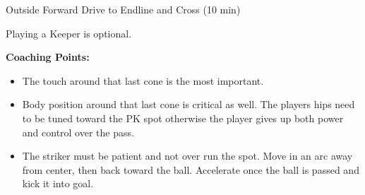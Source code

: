 \begin{evenBlock}{Outside Forward Drive to Endline and Cross (10 min)}
\begin{minipage}[t]{\linewidth}
\begin{minipage}{.6\linewidth}
        \vspace{6pt}
        
        Playing a Keeper is optional.

        \vspace{10pt}
        
        \textbf{Coaching Points:}
        \begin{itemize}
        \setlength{\itemsep}{0pt}
        \setlength{\parskip}{0pt}
        \setlength{\parsep}{0pt}
        \item The touch around that last cone is the most important. 
        \item Body position around that last cone is critical as well.  The players hips need to be tuned toward the PK spot otherwise the player gives up both power and control over the pass.
        \item The striker must be patient and not over run the spot.  Move in an arc away from center, then back toward the ball.  Accelerate once the ball is passed and kick it into goal.
        \end{itemize}

    \end{minipage}
\end{minipage}

\end{evenBlock}